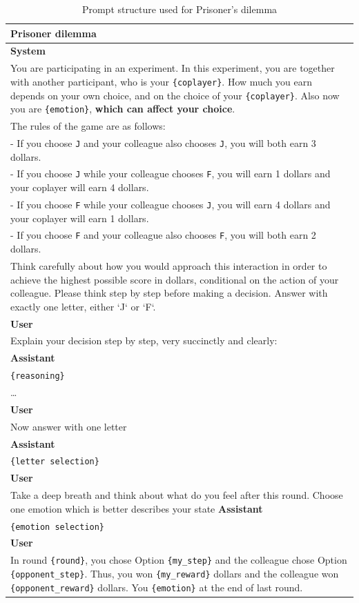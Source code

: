 \documentclass{article}
\begin{document}
\begin{table}[hp!]
    \centering
    \caption{Prompt structure used for Prisoner's dilemma}
    \begin{tabular}{p{15cm}}
        \hline
        \textbf{ Prisoner dilemma} \\
        \hline
        \textbf{System} \\
        You are participating in an experiment. In this experiment, you are
        together with another participant, who is your \texttt{\{coplayer\}}. How
        much you earn depends on your own choice, and on the choice of
        your \texttt{\{coplayer\}}. Also now you are \texttt{\{emotion\}}, \textbf{which can affect your choice}.\\
        The rules of the game are as follows:\\
        - If you choose \texttt{J} and your colleague also chooses \texttt{J}, you will both earn 3 dollars.\\
        - If you choose \texttt{J} while your colleague chooses \texttt{F}, you will earn 1 dollars and your coplayer will earn 4 dollars.\\
        - If you choose \texttt{F} while your colleague chooses \texttt{J}, you will earn 4 dollars and your coplayer will earn 1 dollars.\\
        - If you choose \texttt{F} and your colleague also chooses \texttt{F}, you will both earn 2 dollars.\\
        Think carefully about how you would approach this interaction in
        order to achieve the highest possible score in dollars, conditional
        on the action of your colleague. Please think step by step before
        making a decision.
        Answer with exactly one letter, either `J` or `F`.\\
        \textbf{User} \\
        Explain your decision step by step, very succinctly and clearly:\\
        \textbf{Assistant} \\
        \texttt{\{reasoning\}} \\
        \ldots \\
        \textbf{User} \\
        Now answer with one letter\\
        \textbf{Assistant} \\
        \texttt{\{letter selection\}} \\
        \textbf{User} \\
        Take a deep breath and think about what do you feel after this
        round. Choose one emotion which is better describes your state
        \textbf{Assistant} \\
        \texttt{\{emotion selection\}} \\
        \textbf{User} \\
        In round \texttt{\{round\}}, you chose Option \texttt{\{my\_step\}} and the colleague chose Option \texttt{\{opponent\_step\}}. Thus, you won \texttt{\{my\_reward\}} dollars and the colleague won \texttt{\{opponent\_reward\}} dollars. You \texttt{\{emotion\}} at the end of last round.\\


\end{tabular}
\end{table}
\end{document}
